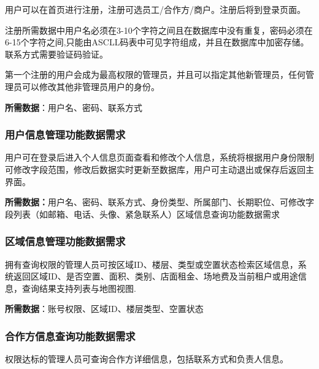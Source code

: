 \documentclass[]{article}
\begin{document}
用户可以在首页进行注册，注册可选员工/合作方/商户。注册后将到登录页面。

注册所需数据中用户名必须在3-10个字符之间且在数据库中没有重复，密码必须在6-15个字符之间,只能由ASCLL码表中可见字符组成，并且在数据库中加密存储。联系方式需要验证码验证。

第一个注册的用户会成为最高权限的管理员，并且可以指定其他新管理员，任何管理员可以修改其他非管理员用户的身份。

\textbf{所需数据}：用户名、密码、联系方式

\hypertarget{ux7528ux6237ux4fe1ux606fux7ba1ux7406ux529fux80fdux6570ux636eux9700ux6c42}{%
\subsubsection{用户信息管理功能数据需求}\label{ux7528ux6237ux4fe1ux606fux7ba1ux7406ux529fux80fdux6570ux636eux9700ux6c42}}

用户可在登录后进入个人信息页面查看和修改个人信息，系统将根据用户身份限制可修改字段范围，修改后数据实时更新至数据库，用户可主动退出或保存后返回主界面。

\textbf{所需数据：}用户名、密码、联系方式、身份类型、所属部门、长期职位、可修改字段列表（如邮箱、电话、头像、紧急联系人）区域信息查询功能数据需求

\hypertarget{ux533aux57dfux4fe1ux606fux7ba1ux7406ux529fux80fdux6570ux636eux9700ux6c42}{%
\subsubsection{区域信息管理功能数据需求}\label{ux533aux57dfux4fe1ux606fux7ba1ux7406ux529fux80fdux6570ux636eux9700ux6c42}}

拥有查询权限的管理人员可按区域ID、楼层、类型或空置状态检索区域信息，系统返回区域ID、是否空置、面积、类别、店面租金、场地费及当前租户或用途信息，查询结果支持列表与地图视图.

\textbf{所需数据}：账号权限、区域ID、楼层类型、空置状态

\hypertarget{ux5408ux4f5cux65b9ux4fe1ux606fux67e5ux8be2ux529fux80fdux6570ux636eux9700ux6c42}{%
\subsubsection{合作方信息查询功能数据需求}\label{ux5408ux4f5cux65b9ux4fe1ux606fux67e5ux8be2ux529fux80fdux6570ux636eux9700ux6c42}}

权限达标的管理人员可查询合作方详细信息，包括联系方式和负责人信息。
\end{document}

